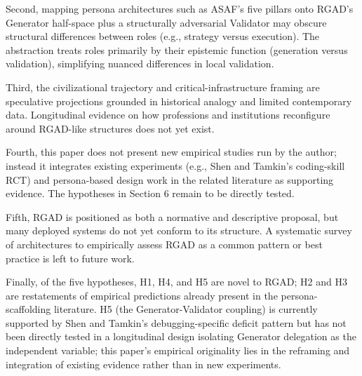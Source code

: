 \documentclass[11pt,a4paper]{article}
\begin{document}
Second, mapping persona architectures such as ASAF's five pillars onto RGAD's Generator half-space plus a structurally adversarial Validator may obscure structural differences between roles (e.g., strategy versus execution). The abstraction treats roles primarily by their epistemic function (generation versus validation), simplifying nuanced differences in local validation.

Third, the civilizational trajectory and critical-infrastructure framing are speculative projections grounded in historical analogy and limited contemporary data. Longitudinal evidence on how professions and institutions reconfigure around RGAD-like structures does not yet exist.

Fourth, this paper does not present new empirical studies run by the author; instead it integrates existing experiments (e.g., Shen and Tamkin's coding-skill RCT) and persona-based design work in the related literature as supporting evidence. The hypotheses in Section 6 remain to be directly tested.

Fifth, RGAD is positioned as both a normative and descriptive proposal, but many deployed systems do not yet conform to its structure. A systematic survey of architectures to empirically assess RGAD as a common pattern or best practice is left to future work.

Finally, of the five hypotheses, H1, H4, and H5 are novel to RGAD; H2 and H3 are restatements of empirical predictions already present in the persona-scaffolding literature. H5 (the Generator-Validator coupling) is currently supported by Shen and Tamkin's debugging-specific deficit pattern but has not been directly tested in a longitudinal design isolating Generator delegation as the independent variable; this paper's empirical originality lies in the reframing and integration of existing evidence rather than in new experiments.
\end{document}
